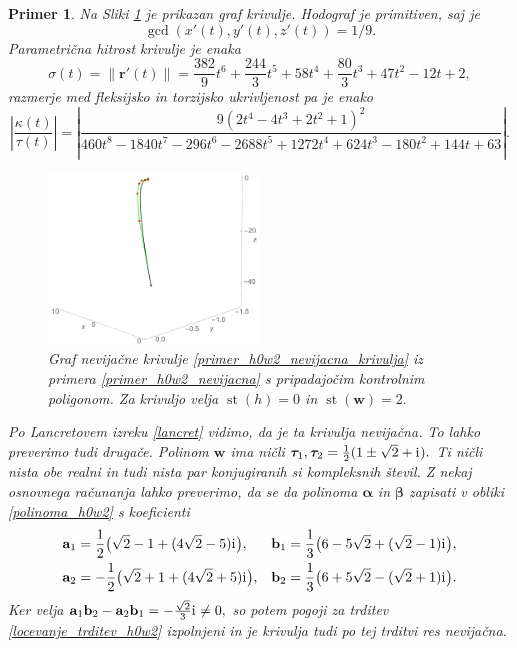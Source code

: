 \documentclass[12pt,a4paper,twoside]{article}
\newcommand{\iu}{\mathrm{i}\mkern1mu} %
\theoremstyle{definition} %
\theoremstyle{plain} %
\theoremstyle{primerstyle}
\newtheorem{primer}[definicija]{Primer}
\numberwithin{equation}{section}  %
\newcommand{\aV}{\mathbf{a}}
\newcommand{\bV}{\mathbf{b}}
\newcommand{\rV}{\mathbf{r}}
\newcommand{\wV}{\mathbf{w}}
\newcommand{\balpha}{\boldsymbol \alpha}
\newcommand{\bbeta}{\boldsymbol \beta}
\newcommand{\btau}{\boldsymbol \tau}
\DeclareMathOperator{\st}{st}
\begin{document}
\begin{primer}
	Na Sliki \ref{fig:h0w2_nevijacna} je prikazan graf krivulje. Hodograf je primitiven, saj je $$\gcd(x'(t),y'(t),z'(t))=1/9.$$ Parametrična hitrost krivulje je enaka
	\begin{equation*}
		\sigma(t)=\lVert\rV'(t)\rVert=\frac{382}{9}t^6+\frac{244}{3}t^5+58t^4+\frac{80}{3}t^3+47t^2-12t+2,
	\end{equation*}
	razmerje med fleksijsko in torzijsko ukrivljenost pa je enako $$\left|\frac{\kappa(t)}{\tau(t)}\right|=\left|\frac{9(2t^4-4t^3+2t^2+1)^2}{460t^8-1840t^7-296t^6-2688t^5+1272t^4+624t^3-180t^2+144t+63}\right|.$$\hspace{-1.2mm}
	\begin{figure}[h!]
	  \centering
	  \includegraphics[width=0.5\textwidth]{images/h0w2_nevijacna.pdf}
	  \caption[Primer nevijačne krivulje ($\st(h)=0,$ $\st(\wV)=2$)]{Graf nevijačne krivulje \eqref{primer_h0w2_nevijacna_krivulja} iz primera \ref{primer_h0w2_nevijacna} s pripadajočim kontrolnim poligonom. Za krivuljo velja $\st(h)=0$ in $\st(\wV)=2.$}
	  \label{fig:h0w2_nevijacna}
	\end{figure}
Po Lancretovem izreku \ref{lancret} vidimo, da je ta krivulja nevijačna. To lahko preverimo tudi drugače. Polinom $\wV$ ima ničli $\btau_1,\btau_2=\frac{1}{2}(1\pm\sqrt{2}+\iu).$ Ti ničli nista obe realni in tudi nista par konjugiranih si kompleksnih števil. Z nekaj osnovnega računanja lahko preverimo, da se da polinoma $\balpha$ in $\bbeta$ zapisati v obliki \eqref{polinoma_h0w2} s koeficienti
	\begin{align*}
		\aV_1&=\frac{1}{2}\big(\sqrt{2}-1+(4\sqrt{2}-5)\iu\big),&\bV_1&=\frac{1}{3}\big(6-5\sqrt{2}+(\sqrt{2}-1)\iu\big),\\
		\aV_2&=-\frac{1}{2}\big(\sqrt{2}+1+(4\sqrt{2}+5)\iu\big),&\bV_2&=\frac{1}{3}\big(6+5\sqrt{2}-(\sqrt{2}+1)\iu\big).
	\end{align*}
	Ker velja $\aV_1\bV_2-\aV_2\bV_1=-\frac{\sqrt{2}}{3}\iu\neq 0,$ so potem pogoji za trditev \ref{locevanje_trditev_h0w2} izpolnjeni in je krivulja tudi po tej trditvi res nevijačna.
\end{primer}
\end{document}
